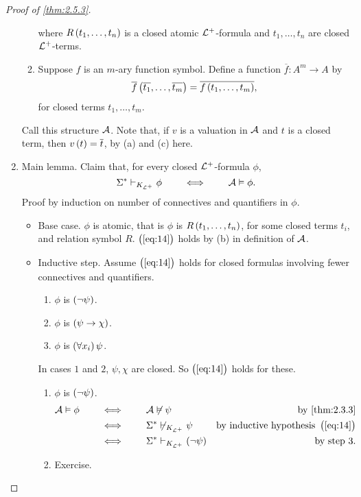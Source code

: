 \begin{proof}[Proof of \ref{thm:2.5.3}]
\begin{enumerate}[leftmargin=0.5in, label=Step \arabic*.]
\begin{enumerate}
where $ R\br{t_1, \dots, t_n} $ is a closed atomic $ \LL^+ $-formula and $ t_1, \dots, t_n $ are closed $ \LL^+ $-terms.
\item Suppose $ f $ is an $ m $-ary function symbol. Define a function $ \overline{f} : A^m \to A $ by
$$ \overline{f}\br{\overline{t_1}, \dots, \overline{t_m}} = \overline{f\br{t_1, \dots, t_m}}, $$
for closed terms $ t_1, \dots, t_m $.
\end{enumerate}
Call this structure $ \AA $. Note that, if $ v $ is a valuation in $ \AA $ and $ t $ is a closed term, then $ v\br{t} = \overline{t} $, by (a) and (c) here.
\pagebreak
\item Main lemma. Claim that, for every closed $ \LL^+ $-formula $ \phi $,
\begin{equation}
\label{eq:14}
\Sigma^* \vdash_{K_{\LL^+}} \phi \qquad \iff \qquad \AA \vDash \phi.
\end{equation}
Proof by induction on number of connectives and quantifiers in $ \phi $.
\begin{itemize}
\item Base case. $ \phi $ is atomic, that is $ \phi $ is $ R\br{t_1, \dots, t_n} $, for some closed terms $ t_i $, and relation symbol $ R $. $ \br{\ref{eq:14}} $ holds by (b) in definition of $ \AA $.
\item Inductive step. Assume $ \br{\ref{eq:14}} $ holds for closed formulas involving fewer connectives and quantifiers.
\begin{enumerate}[leftmargin=0.5in, label=Case \arabic*.]
\item $ \phi $ is $ \notb{\psi} $.
\item $ \phi $ is $ \impb{\psi}{\chi} $.
\item $ \phi $ is $ \fab{x_i}\psi $.
\end{enumerate}
In cases $ 1 $ and $ 2 $, $ \psi, \chi $ are closed. So $ \br{\ref{eq:14}} $ holds for these.
\begin{enumerate}[leftmargin=0.5in, label=Case \arabic*.]
\item $ \phi $ is $ \notb{\psi} $.
\begin{align*}
\AA \vDash \phi \qquad
& \iff \qquad \AA \not\vDash \psi & \text{by \ref{thm:2.3.3}} \\
& \iff \qquad \Sigma^* \not\vdash_{K_{\LL^+}} \psi & \text{by inductive hypothesis} \ \br{\ref{eq:14}} \\
& \iff \qquad \Sigma^* \vdash_{K_{\LL^+}} \notb{\psi} & \text{by step} \ 3.
\end{align*}
\item Exercise.

\end{enumerate}
\end{itemize}
\end{enumerate}
\end{proof}
